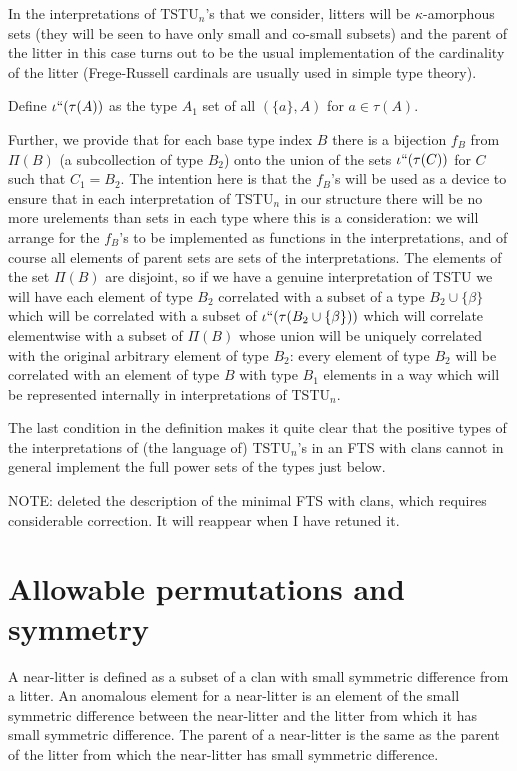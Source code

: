 \documentclass{article}
\begin{document}
\begin{description}
In the interpretations of TSTU$_n$'s that we consider, litters will be $\kappa$-amorphous sets (they will be seen to have only small and co-small subsets) and the parent of the litter in this case turns out to be the usual implementation of the cardinality of the litter (Frege-Russell cardinals are usually used in simple type theory).

Define $\iota``(\tau(A))$ as the type $A_1$ set of all $(\{a\},A)$ for $a \in \tau(A)$.

Further, we provide that for each base type index $B$ there is a bijection $f_B$ from $\Pi(B)$ (a subcollection of type $B_2$) onto the union of the sets $\iota``(\tau(C))$ for $C$ such that
$C_1=B_2$. The intention here is that the $f_B$'s will be used as a device to ensure that in each interpretation of TSTU$_n$ in our structure there will be no more urelements than sets in each type where this is a consideration:  
we will arrange for the $f_B$'s to be implemented as functions in the interpretations, and of course all elements of parent sets are sets of the interpretations.  The elements of the set $\Pi(B)$ are disjoint, so if we have a genuine interpretation of TSTU we will have each element of type $B_2$ correlated with a subset of a type $B_2 \cup \{\beta\}$ which will be correlated with
a subset of $\iota``(\tau(B_2 \cup \{\beta\}))$ which will correlate elementwise with a subset of $\Pi(B)$ whose union will be uniquely correlated with the original arbitrary element of type $B_2$:
every element of type $B_2$ will be correlated with an element of type $B$ with type $B_1$ elements  in a way which will be represented internally in interpretations of TSTU$_n$.

\end{description}

The last condition in the definition makes it quite clear that the positive types of the interpretations of (the language of) TSTU$_n$'s in an FTS with clans cannot in general implement the full power sets of the types just below.

NOTE:  deleted the description of the minimal FTS with clans, which requires considerable correction.  It will reappear when I have retuned it.

\newpage

\section{Allowable permutations and symmetry}

A near-litter is defined as a subset of a clan with small symmetric difference from a litter.   An anomalous element for a near-litter is an element of the small symmetric difference between the near-litter and the litter from which it has small symmetric difference.   The parent of a near-litter is the same as the parent of the litter from which the near-litter has small symmetric difference.
\end{document}
